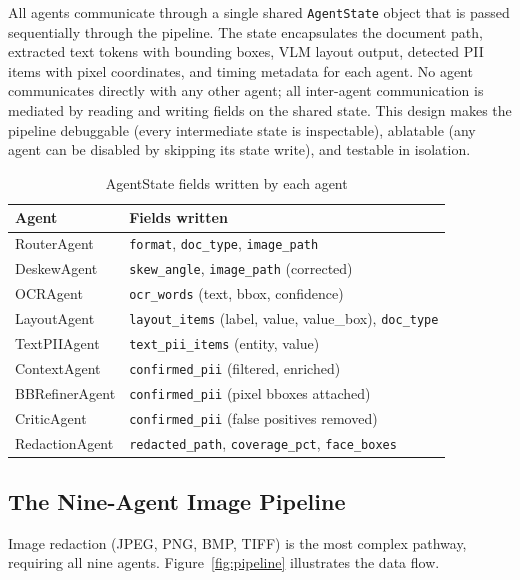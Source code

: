 All agents communicate through a single shared
\texttt{AgentState} object that is passed sequentially
through the pipeline.
The state encapsulates the document path, extracted
text tokens with bounding boxes, VLM layout output,
detected PII items with pixel coordinates, and timing
metadata for each agent.
No agent communicates directly with any other agent;
all inter-agent communication is mediated by reading
and writing fields on the shared state.
This design makes the pipeline debuggable (every
intermediate state is inspectable), ablatable (any
agent can be disabled by skipping its state write),
and testable in isolation.

\begin{table}[h]\centering
\small
\caption{AgentState fields written by each agent}
\label{tab:agentstate}
\begin{tabular}{ll}
\toprule
Agent & Fields written \\
\midrule
RouterAgent      & \texttt{format}, \texttt{doc\_type}, \texttt{image\_path} \\
DeskewAgent      & \texttt{skew\_angle}, \texttt{image\_path} (corrected) \\
OCRAgent         & \texttt{ocr\_words} (text, bbox, confidence) \\
LayoutAgent      & \texttt{layout\_items} (label, value, value\_box), \texttt{doc\_type} \\
TextPIIAgent     & \texttt{text\_pii\_items} (entity, value) \\
ContextAgent     & \texttt{confirmed\_pii} (filtered, enriched) \\
BBRefinerAgent   & \texttt{confirmed\_pii} (pixel bboxes attached) \\
CriticAgent      & \texttt{confirmed\_pii} (false positives removed) \\
RedactionAgent   & \texttt{redacted\_path}, \texttt{coverage\_pct}, \texttt{face\_boxes} \\
\bottomrule
\end{tabular}
\end{table}

\subsection{The Nine-Agent Image Pipeline}

Image redaction (JPEG, PNG, BMP, TIFF) is the most
complex pathway, requiring all nine agents.
Figure~\ref{fig:pipeline} illustrates the data flow.

